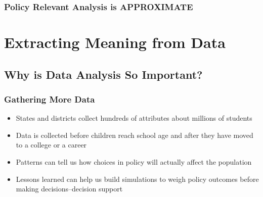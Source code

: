 \documentclass{beamer}
\begin{document}
{
\begin{frame}[plain]
\frametitle{Policy Relevant Analysis is APPROXIMATE}
\end{frame}
}


\section{Extracting Meaning from Data}
\label{sec:extrct-meaning}

\subsection{Why is Data Analysis So Important?}
\begin{frame}
\frametitle{Gathering More Data}
\begin{itemize}
  \item States and districts collect hundreds of attributes about millions of students
  \item Data is collected before children reach school age and after they have moved to a college or a career
  \item Patterns can tell us how choices in policy will actually affect the population
  \item Lessons learned can help us build simulations to weigh policy outcomes before making decisions--decision support
\end{itemize}
\end{frame}
\end{document}
